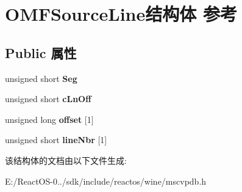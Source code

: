 \hypertarget{struct_o_m_f_source_line}{}\section{O\+M\+F\+Source\+Line结构体 参考}
\label{struct_o_m_f_source_line}
\subsection*{Public 属性}
\begin{DoxyCompactItemize}
\item 
\mbox{\label{struct_o_m_f_source_line_a5e30d6e6fd3db63feaeba8a2057e8402}} 
unsigned short {\bfseries Seg}
\item 
\mbox{\label{struct_o_m_f_source_line_ac9060edcc61d97ce9b7a98acfa5f5595}} 
unsigned short {\bfseries c\+Ln\+Off}
\item 
\mbox{\label{struct_o_m_f_source_line_a513760e8f52f77360a1cd94fbfcbfcb4}} 
unsigned long {\bfseries offset} \mbox{[}1\mbox{]}
\item 
\mbox{\label{struct_o_m_f_source_line_afcaef63cc6161aae7df0ffdf0e19f005}} 
unsigned short {\bfseries line\+Nbr} \mbox{[}1\mbox{]}
\end{DoxyCompactItemize}


该结构体的文档由以下文件生成\+:\begin{DoxyCompactItemize}
\item 
E\+:/\+React\+O\+S-\/0../sdk/include/reactos/wine/mscvpdb.\+h\end{DoxyCompactItemize}
